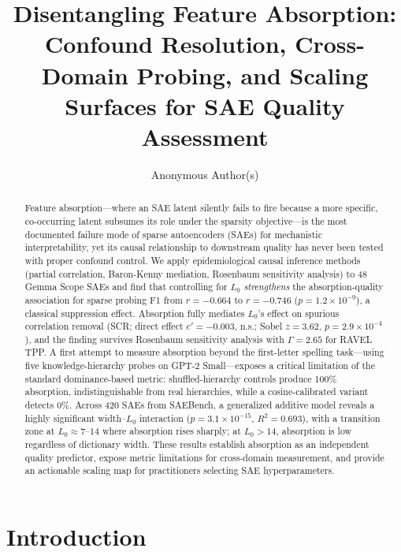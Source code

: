 \documentclass{article}
\title{Disentangling Feature Absorption: Confound Resolution, Cross-Domain Probing, and Scaling Surfaces for SAE Quality Assessment}
\author{%
  Anonymous Author(s)
}
\begin{document}
\maketitle

\begin{abstract}
Feature absorption---where an SAE latent silently fails to fire because a more specific, co-occurring latent subsumes its role under the sparsity objective---is the most documented failure mode of sparse autoencoders (SAEs) for mechanistic interpretability, yet its causal relationship to downstream quality has never been tested with proper confound control.
We apply epidemiological causal inference methods (partial correlation, Baron-Kenny mediation, Rosenbaum sensitivity analysis) to 48 Gemma Scope SAEs and find that controlling for $L_0$ \emph{strengthens} the absorption-quality association for sparse probing F1 from $r = -0.664$ to $r = -0.746$ ($p = 1.2 \times 10^{-9}$), a classical suppression effect.
Absorption fully mediates $L_0$'s effect on spurious correlation removal (SCR; direct effect $c' = -0.003$, n.s.; Sobel $z = 3.62$, $p = 2.9 \times 10^{-4}$), and the finding survives Rosenbaum sensitivity analysis with $\Gamma = 2.65$ for RAVEL TPP.
A first attempt to measure absorption beyond the first-letter spelling task---using five knowledge-hierarchy probes on GPT-2 Small---exposes a critical limitation of the standard dominance-based metric: shuffled-hierarchy controls produce 100\% absorption, indistinguishable from real hierarchies, while a cosine-calibrated variant detects 0\%.
Across 420 SAEs from SAEBench, a generalized additive model reveals a highly significant width--$L_0$ interaction ($p = 3.1 \times 10^{-15}$, $R^2 = 0.693$), with a transition zone at $L_0 \approx 7$--$14$ where absorption rises sharply; at $L_0 > 14$, absorption is low regardless of dictionary width.
These results establish absorption as an independent quality predictor, expose metric limitations for cross-domain measurement, and provide an actionable scaling map for practitioners selecting SAE hyperparameters.
\end{abstract}

\section{Introduction}
\label{sec:intro}
\end{document}
